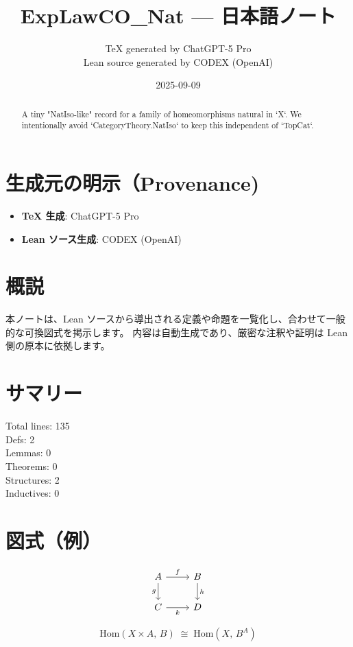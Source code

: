 \documentclass[12pt]{article}
\title{ExpLawCO\_Nat — 日本語ノート}
\author{TeX generated by ChatGPT-5 Pro\\Lean source generated by CODEX (OpenAI)}
\date{2025-09-09}
\theoremstyle{definition}
\begin{document}
\maketitle

\begin{abstract}
A tiny "NatIso-like" record for a family of homeomorphisms natural in `X`.
We intentionally avoid `CategoryTheory.NatIso` to keep this independent of `TopCat`.
\end{abstract}

\section*{生成元の明示（Provenance)}
\begin{itemize}
  \item \textbf{TeX 生成}: ChatGPT-5 Pro
  \item \textbf{Lean ソース生成}: CODEX (OpenAI)
\end{itemize}

\section*{概説}
本ノートは、Lean ソースから導出される定義や命題を一覧化し、合わせて一般的な可換図式を掲示します。
内容は自動生成であり、厳密な注釈や証明は Lean 側の原本に依拠します。

\section*{サマリー}
Total lines: 135\\
Defs: 2\\
Lemmas: 0\\
Theorems: 0\\
Structures: 2\\
Inductives: 0

\section*{図式（例）}

\[
\begin{tikzcd}
A \arrow[r, "f"] \arrow[d, "g"'] & B \arrow[d, "h"] \\
C \arrow[r, "k"'] & D
\end{tikzcd}
\]



\[
\mathrm{Hom}(X\times A,\,B) \;\cong\; \mathrm{Hom}(X,\,B^A)
\]
\end{document}
